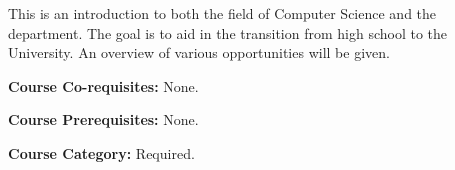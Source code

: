   This is an introduction to both the field of Computer Science and
   the department.  The goal is to aid in the transition from high
   school to the University.  An overview of various opportunities
   will be given.
   \item {\bf Course Co-requisites:}
  None.
    \item {\bf Course Prerequisites:}
  None.
    \item {\bf Course Category:}
  Required.
